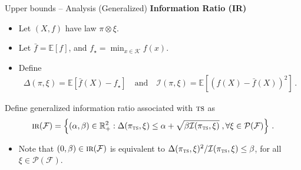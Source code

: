 \documentclass{beamer}
\newcommand{\E}{\mathbb{E}}
\newcommand{\R}{\mathbb{R}}
\newcommand{\cK}{\mathcal{K}}
\newcommand{\cF}{\mathcal{F}}
\newcommand{\cP}{\mathcal{P}}
\newcommand{\cI}{\mathcal{I}}
\newcommand{\ts}{{\textsc{ts}}}
\newcommand{\IR}{\operatorname{\textsc{ir}}}
\begin{document}
\begin{frame}{Upper bounds -- Analysis}
    (Generalized) \textbf{Information Ratio (IR)}
    \vspace{0.5em}
    \small
    \begin{itemize}
        \item Let $(X,f)$ have law $\pi \otimes \xi$.
        \item Let $\bar{f} = \E[f]$, and $f_\star = \min_{x \in \cK} f(x)$.
        \item Define
              \begin{align*}
                  \Delta(\pi, \xi) = \E[\bar{f}(X) - f_\star]
                  \quad \text{and} \quad \cI(\pi, \xi) = \E[(f(X) - \bar{f}(X))^2]\,.
              \end{align*}
    \end{itemize}
    \begin{tcolorbox}[title=Generalized IR ,colback=green!5!white,colframe=green!50!black]
        Define generalized information ratio associated with $\ts$ as
        \[
            \IR(\cF) = \left\{(\alpha, \beta) \in \R_+^2 : \Delta(\pi_{\ts}, \xi) \leq \alpha + \sqrt{\beta \cI(\pi_{\ts}, \xi)}  \;,\forall \xi \in \cP(\cF)\right\} \,.
        \]
    \end{tcolorbox}
    \begin{itemize}
        \item
              Note that $(0,\beta) \in \IR(\cF)$ is equivalent to $\Delta(\pi_{\ts}, \xi)^2/\cI(\pi_{\ts}, \xi) \leq \beta$, for all $\xi \in\cP(\cF)$.
    \end{itemize}
\end{frame}

\end{document}
